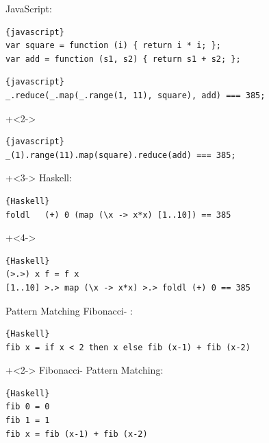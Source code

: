 \begin{frame}[fragile]{}
JavaScript:
\begin{lstlisting}{javascript}
var square = function (i) { return i * i; };
var add = function (s1, s2) { return s1 + s2; };
\end{lstlisting}

\begin{lstlisting}{javascript}
_.reduce(_.map(_.range(1, 11), square), add) === 385;
\end{lstlisting}

\onslide+<2->

\begin{lstlisting}{javascript}
_(1).range(11).map(square).reduce(add) === 385;
\end{lstlisting}

\onslide+<3->
Haskell:
\begin{lstlisting}{Haskell}
foldl	(+) 0 (map (\x -> x*x) [1..10]) == 385
\end{lstlisting}
\onslide+<4->
\begin{lstlisting}{Haskell}
(>.>) x f = f x
[1..10] >.> map (\x -> x*x) >.> foldl (+) 0 == 385
\end{lstlisting}

\end{frame}

\begin{frame}[fragile]{}

\begin{center}
\Large
{}
\end{center}

\end{frame}

\begin{frame}[fragile]{Pattern Matching}
Fibonacci- \glqq {}\grqq{}:
\begin{lstlisting}{Haskell}
fib x = if x < 2 then x else fib (x-1) + fib (x-2)
\end{lstlisting}

\onslide+<2->
\vfill
Fibonacci- Pattern Matching:
\begin{lstlisting}{Haskell}
fib 0 = 0
fib 1 = 1
fib x = fib (x-1) + fib (x-2)
\end{lstlisting}
\end{frame}

